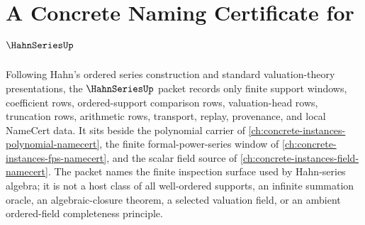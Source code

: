 \chapter{A Concrete Naming Certificate for $\HahnSeriesUp$}
\label{ch:concrete-instances-hahn-series-namecert}

Following Hahn's ordered series construction and standard valuation-theory presentations, the $\HahnSeriesUp$ packet records only finite support windows, coefficient rows, ordered-support comparison rows, valuation-head rows, truncation rows, arithmetic rows, transport, replay, provenance, and local NameCert data. It sits beside the polynomial carrier of \autoref{ch:concrete-instances-polynomial-namecert}, the finite formal-power-series window of \autoref{ch:concrete-instances-fps-namecert}, and the scalar field source of \autoref{ch:concrete-instances-field-namecert}. The packet names the finite inspection surface used by Hahn-series algebra; it is not a host class of all well-ordered supports, an infinite summation oracle, an algebraic-closure theorem, a selected valuation field, or an ambient ordered-field completeness principle.

